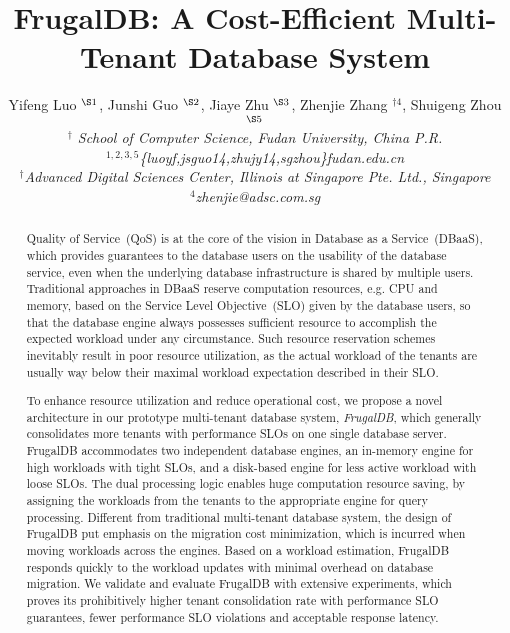 \documentclass[conference]{IEEEtran}
\begin{document}

\title{FrugalDB: A Cost-Efficient Multi-Tenant Database System }

\author{
Yifeng Luo $^{\S 1}$, Junshi Guo $^{\S 2}$, Jiaye Zhu $^{\S 3}$, Zhenjie Zhang $^{\dag 4}$, Shuigeng Zhou $^{\S 5}$
\vspace{1.6mm}\\
\fontsize{10}{10}\selectfont\itshape
$^{\dag}$ School of Computer Science, Fudan University, China P.R.\\
\fontsize{9}{9}\selectfont\ttfamily\upshape
$^{1,2,3,5}$\{luoyf,jsguo14,zhujy14,sgzhou\}fudan.edu.cn
\vspace{1.2mm}\\
\fontsize{10}{10}\selectfont\rmfamily\itshape
$^{\dag}$Advanced Digital Sciences Center, Illinois at Singapore Pte. Ltd., Singapore \\
\fontsize{9}{9}\selectfont\ttfamily\upshape
$^{4}$zhenjie@adsc.com.sg
}


\maketitle

\begin{abstract}
Quality of Service~(QoS) is at the core of the vision in Database as a Service~(DBaaS), which provides guarantees to the database users on the usability of the database service, even when the underlying database infrastructure is shared by multiple users. Traditional approaches in DBaaS reserve computation resources, e.g. CPU and memory, based on the Service Level Objective~(SLO) given by the database users, so that the database engine always possesses sufficient resource to accomplish the expected workload under any circumstance. Such resource reservation schemes inevitably result in poor resource utilization, as the actual workload of the tenants are usually way below their maximal workload expectation described in their SLO.

To enhance resource utilization and reduce operational cost, we propose a novel architecture in our prototype multi-tenant database system, \emph{FrugalDB}, which generally consolidates more tenants with performance SLOs on one single database server. FrugalDB accommodates two independent database engines, an in-memory engine for high workloads with tight SLOs, and a disk-based engine for less active workload with loose SLOs. The dual processing logic enables huge computation resource saving, by assigning the workloads from the tenants to the appropriate engine for query processing. Different from traditional multi-tenant database system, the design of FrugalDB put emphasis on the migration cost minimization, which is incurred when moving workloads across the engines. Based on a workload estimation, FrugalDB responds quickly to the workload updates with minimal overhead on database migration. We validate and evaluate FrugalDB with extensive experiments, which proves its prohibitively higher tenant consolidation rate with performance SLO guarantees, fewer performance SLO violations and acceptable response latency.
\end{abstract}
\end{document}
